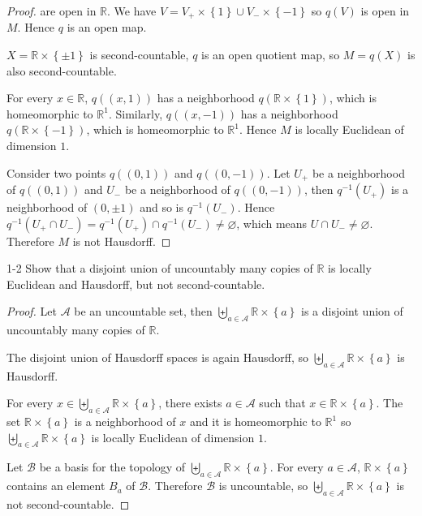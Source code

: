 \begin{proof}
    are open in \( \mathbb{R} \). We have \( V = V_{+} \times \left\{ 1 \right\} \cup V_{-} \times \left\{ -1 \right\} \) so \( q(V) \) is open in \( M \). Hence \( q \) is an open map.

    \( X = \mathbb{R} \times \left\{ \pm 1 \right\} \) is second-countable, \( q \) is an open quotient map, so \( M = q(X) \) is also second-countable.

    For every \( x \in \mathbb{R} \), \( q((x, 1)) \) has a neighborhood \( q(\mathbb{R} \times \left\{ 1 \right\}) \), which is homeomorphic to \( \mathbb{R}^{1} \). Similarly, \( q((x, -1)) \) has a neighborhood \( q(\mathbb{R} \times \left\{ -1 \right\}) \), which is homeomorphic to \( \mathbb{R}^{1} \). Hence \( M \) is locally Euclidean of dimension \( 1 \).

    Consider two points \( q((0, 1)) \) and \( q((0, -1)) \). Let \( U_{+} \) be a neighborhood of \( q((0, 1)) \) and \( U_{-} \) be a neighborhood of \( q((0, -1)) \), then \( q^{-1}(U_{+}) \) is a neighborhood of \( (0, \pm 1) \) and so is \( q^{-1}(U_{-}) \). Hence \( q^{-1}(U_{+} \cap U_{-}) = q^{-1}(U_{+}) \cap q^{-1}(U_{-}) \ne \varnothing \), which means \( U \cap U_{-} \ne \varnothing \). Therefore \( M \) is not Hausdorff.
\end{proof}

\begin{problem}{1-2}
    Show that a disjoint union of uncountably many copies of \( \mathbb{R} \) is locally Euclidean and Hausdorff, but not second-countable.
\end{problem}

\begin{proof}
    Let \( \mathscr{A} \) be an uncountable set, then \( \biguplus_{a \in \mathscr{A}} \mathbb{R} \times \left\{ a \right\} \) is a disjoint union of uncountably many copies of \( \mathbb{R} \).

    The disjoint union of Hausdorff spaces is again Hausdorff, so \( \biguplus_{a \in \mathscr{A}} \mathbb{R} \times \left\{ a \right\} \) is Hausdorff.

    For every \( x \in \biguplus_{a \in \mathscr{A}} \mathbb{R} \times \left\{ a \right\} \), there exists \( a \in \mathscr{A} \) such that \( x \in \mathbb{R} \times \left\{ a \right\} \). The set \( \mathbb{R} \times \left\{ a \right\} \) is a neighborhood of \( x \) and it is homeomorphic to \( \mathbb{R}^{1} \) so \( \biguplus_{a \in \mathscr{A}} \mathbb{R} \times \left\{ a \right\} \) is locally Euclidean of dimension \( 1 \).

    Let \( \mathscr{B} \) be a basis for the topology of \( \biguplus_{a \in \mathscr{A}} \mathbb{R} \times \left\{ a \right\} \). For every \( a \in \mathscr{A} \), \( \mathbb{R} \times \left\{ a \right\} \) contains an element \( B_{a} \) of \( \mathscr{B} \). Therefore \( \mathscr{B} \) is uncountable, so \( \biguplus_{a \in \mathscr{A}} \mathbb{R} \times \left\{ a \right\} \) is not second-countable.
\end{proof}

